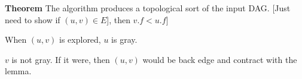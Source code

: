 \documentclass{article}
\begin{document}
\textbf{Theorem} The algorithm produces a topological sort of the input DAG.
[Just need to show if \((u, v) \in E\)], then \(v.f < u.f\)]

When \((u, v)\) is explored, \(u\) is gray.

\(v\) is not gray. If it were, then \((u, v)\) would be back edge and contract with the lemma.
\end{document}
